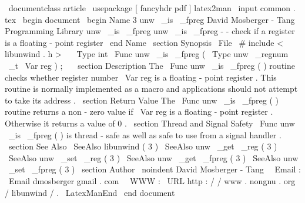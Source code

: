\
documentclass
{
article
}
\
usepackage
[
fancyhdr
pdf
]
{
latex2man
}
\
input
{
common
.
tex
}
\
begin
{
document
}
\
begin
{
Name
}
{
3
}
{
unw
\
_is
\
_fpreg
}
{
David
Mosberger
-
Tang
}
{
Programming
Library
}
{
unw
\
_is
\
_fpreg
}
unw
\
_is
\
_fpreg
-
-
check
if
a
register
is
a
floating
-
point
register
\
end
{
Name
}
\
section
{
Synopsis
}
\
File
{
\
#
include
<
libunwind
.
h
>
}
\
\
\
Type
{
int
}
\
Func
{
unw
\
_is
\
_fpreg
}
(
\
Type
{
unw
\
_regnum
\
_t
}
\
Var
{
reg
}
)
;
\
\
\
section
{
Description
}
The
\
Func
{
unw
\
_is
\
_fpreg
}
(
)
routine
checks
whether
register
number
\
Var
{
reg
}
is
a
floating
-
point
register
.
This
routine
is
normally
implemented
as
a
macro
and
applications
should
not
attempt
to
take
its
address
.
\
section
{
Return
Value
}
The
\
Func
{
unw
\
_is
\
_fpreg
}
(
)
routine
returns
a
non
-
zero
value
if
\
Var
{
reg
}
is
a
floating
-
point
register
.
Otherwise
it
returns
a
value
of
0
.
\
section
{
Thread
and
Signal
Safety
}
\
Func
{
unw
\
_is
\
_fpreg
}
(
)
is
thread
-
safe
as
well
as
safe
to
use
from
a
signal
handler
.
\
section
{
See
Also
}
\
SeeAlso
{
libunwind
(
3
)
}
\
SeeAlso
{
unw
\
_get
\
_reg
(
3
)
}
\
SeeAlso
{
unw
\
_set
\
_reg
(
3
)
}
\
SeeAlso
{
unw
\
_get
\
_fpreg
(
3
)
}
\
SeeAlso
{
unw
\
_set
\
_fpreg
(
3
)
}
\
section
{
Author
}
\
noindent
David
Mosberger
-
Tang
\
\
Email
:
\
Email
{
dmosberger
gmail
.
com
}
\
\
WWW
:
\
URL
{
http
:
/
/
www
.
nongnu
.
org
/
libunwind
/
}
.
\
LatexManEnd
\
end
{
document
}

